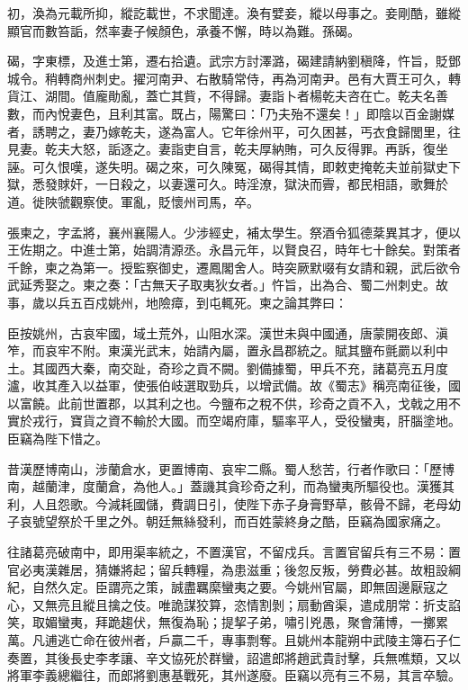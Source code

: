 \begin{pinyinscope}
 初，渙為元載所抑，縱訖載世，不求聞達。渙有嬖妾，縱以母事之。妾剛酷，雖縱顯官而數笞詬，然率妻子候顏色，承養不懈，時以為難。孫碣。



 碣，字東標，及進士第，遷右拾遺。武宗方討澤潞，碣建請納劉稹降，忤旨，貶鄧城令。稍轉商州刺史。擢河南尹、右散騎常侍，再為河南尹。邑有大賈王可久，轉貨江、湖間。值龐勛亂，蓋亡其貲，不得歸。妻詣卜者楊乾夫咨在亡。乾夫名善數，而內悅妻色，且利其富。既占，陽驚曰：「乃夫殆不還矣！」即陰以百金謝媒者，誘聘之，妻乃嫁乾夫，遂為富人。它年徐州平，可久困甚，丐衣食歸閭里，往見妻。乾夫大怒，詬逐之。妻詣吏自言，乾夫厚納賄，可久反得罪。再訴，復坐誣。可久恨嘆，遂失明。碣之來，可久陳冤，碣得其情，即敕吏掩乾夫並前獄史下獄，悉發賕奸，一日殺之，以妻還可久。時淫潦，獄決而霽，都民相語，歌舞於道。徙陜虢觀察使。軍亂，貶懷州司馬，卒。



 張柬之，字孟將，襄州襄陽人。少涉經史，補太學生。祭酒令狐德棻異其才，便以王佐期之。中進士第，始調清源丞。永昌元年，以賢良召，時年七十餘矣。對策者千餘，柬之為第一。授監察御史，遷鳳閣舍人。時突厥默啜有女請和親，武后欲令武延秀娶之。柬之奏：「古無天子取夷狄女者。」忤旨，出為合、蜀二州刺史。故事，歲以兵五百戍姚州，地險瘴，到屯輒死。柬之論其弊曰：



 臣按姚州，古哀牢國，域土荒外，山阻水深。漢世未與中國通，唐蒙開夜郎、滇笮，而哀牢不附。東漢光武末，始請內屬，置永昌郡統之。賦其鹽布氈罽以利中土。其國西大秦，南交趾，奇珍之貢不闕。劉備據蜀，甲兵不充，諸葛亮五月度瀘，收其產入以益軍，使張伯岐選取勁兵，以增武備。故《蜀志》稱亮南征後，國以富饒。此前世置郡，以其利之也。今鹽布之稅不供，珍奇之貢不入，戈戟之用不實於戎行，寶貨之資不輸於大國。而空竭府庫，驅率平人，受役蠻夷，肝腦塗地。臣竊為陛下惜之。



 昔漢歷博南山，涉蘭倉水，更置博南、哀牢二縣。蜀人愁苦，行者作歌曰：「歷博南，越蘭津，度蘭倉，為他人。」蓋譏其貪珍奇之利，而為蠻夷所驅役也。漢獲其利，人且怨歌。今減耗國儲，費調日引，使陛下赤子身膏野草，骸骨不歸，老母幼子哀號望祭於千里之外。朝廷無絲發利，而百姓蒙終身之酷，臣竊為國家痛之。



 往諸葛亮破南中，即用渠率統之，不置漢官，不留戍兵。言置官留兵有三不易：置官必夷漢雜居，猜嫌將起；留兵轉糧，為患滋重；後忽反叛，勞費必甚。故粗設綱紀，自然久定。臣謂亮之策，誠盡羈縻蠻夷之要。今姚州官屬，即無固邊厭寇之心，又無亮且縱且擒之伎。唯詭謀狡算，恣情割剝；扇動酋渠，遣成朋常：折支諂笑，取媚蠻夷，拜跪趨伏，無復為恥；提挈子弟，嘯引兇愚，聚會蒲博，一擲累萬。凡逋逃亡命在彼州者，戶贏二千，專事剽奪。且姚州本龍朔中武陵主簿石子仁奏置，其後長史李孝讓、辛文協死於群蠻，詔遣郎將趙武貴討擊，兵無噍類，又以將軍李義總繼往，而郎將劉惠基戰死，其州遂廢。臣竊以亮有三不易，其言卒驗。




\end{pinyinscope}
